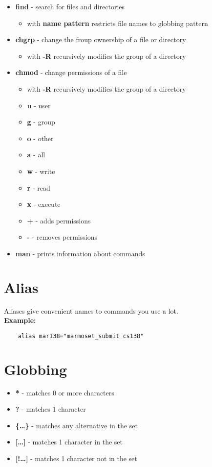 \documentclass[12pt]{article}
\begin{document}
\begin{itemize}
    \item \textbf{find} - search for files and directories
    \begin{itemize}
        \item with \textbf{name pattern} restricts file names to globbing pattern
    \end{itemize}

    \item \textbf{chgrp} - change the froup ownership of a file or directory
    \begin{itemize}
        \item with \textbf{-R} recursively modifies the group of a directory
    \end{itemize}

    \item \textbf{chmod} - change permissions of a file
    \begin{itemize}
        \item with \textbf{-R} recursively modifies the group of a directory
        \item \textbf{u} - user
        \item \textbf{g} - group
        \item \textbf{o} - other
        \item \textbf{a} - all
        \item \textbf{w} - write
        \item \textbf{r} - read
        \item \textbf{x} - execute
        \item \textbf{+} - adds permissions
        \item \textbf{-} - removes permissions
    \end{itemize}

    \item \textbf{man} - prints information about commands
\end{itemize}

\section{Alias}
Aliases give convenient names to commands you use a lot.\\
\textbf{Example:} \begin{verbatim}
    alias mar138="marmoset_submit cs138"
\end{verbatim} 

\section{Globbing}
\begin{itemize}
    \item \textbf{*} - matches 0 or more characters
    \item \textbf{?} - matches 1 character
    \item \textbf{\{\dots\}} - matches any alternative in the set
    \item \textbf{[\dots]} - matches 1 character in the set
    \item \textbf{[!\dots]} - matches 1 character not in the set
\end{itemize}
\end{document}
